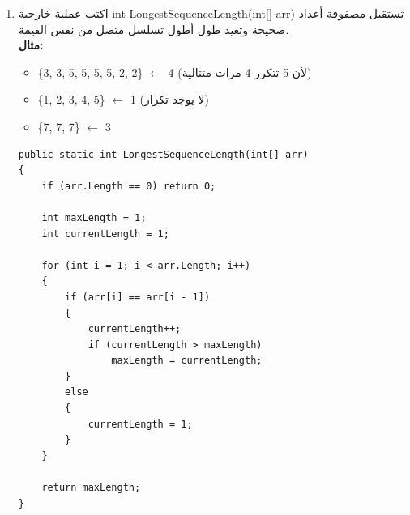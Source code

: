 \documentclass[14pt]{extarticle}
\begin{document}
\begin{enumerate}[resume, itemsep=2em]
\begin{boxSolution}
\begin{english}
\begin{verbatim}
    int count = 1;
    for (int i = 1; i < arr.Length; i++)
    {
        if (arr[i] < arr[i - 1])
        {
            count++;
            if (count >= length)
                return true;
        }
        else
        {
            count = 1;
        }
    }

    return false;
}
    \end{verbatim}
    \end{english}
    \end{boxSolution}
    \fi

    \item
    اكتب عملية خارجية \textenglish{int LongestSequenceLength(int[] arr)} تستقبل مصفوفة أعداد صحيحة وتعيد طول أطول تسلسل متصل من نفس القيمة.\\
    \textbf{مثال:}
    \begin{itemize}
        \item \textenglish{\{3, 3, 5, 5, 5, 5, 2, 2\}} $\leftarrow$ 4 (لأن 5 تتكرر 4 مرات متتالية)
        \item \textenglish{\{1, 2, 3, 4, 5\}} $\leftarrow$ 1 (لا يوجد تكرار)
        \item \textenglish{\{7, 7, 7\}} $\leftarrow$ 3
    \end{itemize}
    \ifwithsols
    \begin{boxSolution}
    \begin{english}
    \begin{verbatim}
public static int LongestSequenceLength(int[] arr)
{
    if (arr.Length == 0) return 0;

    int maxLength = 1;
    int currentLength = 1;

    for (int i = 1; i < arr.Length; i++)
    {
        if (arr[i] == arr[i - 1])
        {
            currentLength++;
            if (currentLength > maxLength)
                maxLength = currentLength;
        }
        else
        {
            currentLength = 1;
        }
    }

    return maxLength;
}
    \end{verbatim}
    \end{english}
    \end{boxSolution}
    \fi


\end{enumerate}
\end{document}
